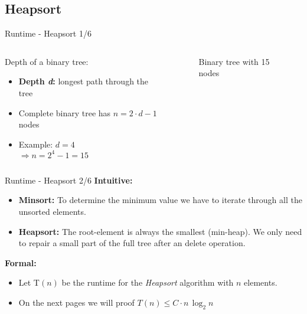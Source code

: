 \subsection{Heapsort}

\begin{frame}{Runtime - Heapsort 1/6}
  \begin{columns}
    \begin{column}{0.5\textwidth}
      Depth of a binary tree:
      \begin{itemize}
        \item
          \textbf{Depth \textit{d}:}
          longest path through the tree
        \item
          Complete binary tree has $n = 2 \cdot d - 1$ nodes
        \item
          Example: $d = 4$\\
          $\Rightarrow n = 2^4 - 1 = 15$
      \end{itemize}
    \end{column}
    \begin{column}{0.5\textwidth}
      \begin{figure}
        \begin{centering}%
          \caption{Binary tree with 15 nodes}%
          \label{fig:binary_tree}%
        \end{centering}%
      \end{figure}
    \end{column}
  \end{columns}
\end{frame}


\begin{frame}{Runtime - Heapsort 2/6}
  \textbf{Intuitive:}
  \begin{itemize}
    \item
    \textbf{Minsort:}
    To determine the minimum value we have to iterate through all the
    unsorted elements.
    \item
    \textbf{Heapsort:}
    The root-element is always the smallest (min-heap).
    We only need to repair a small part of the full tree after an delete
    operation.
  \end{itemize}
  \textbf{Formal:}
  \begin{itemize}
    \item 
      Let T$(n)$ be the runtime for the \textit{Heapsort}
      algorithm with $n$ elements.
    \item
      On the next pages we will proof $T(n) \leq C \cdot n \, \log_2 n$
  \end{itemize}
\end{frame}